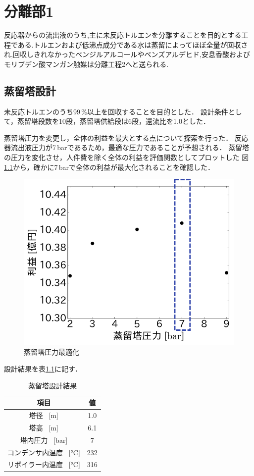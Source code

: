 \documentclass[a4j]{jsreport}
\begin{document}
\clearpage
\chapter{分離部1}
反応器からの流出液のうち,主に未反応トルエンを分離することを目的とする工程である.トルエンおよび低沸点成分である水は蒸留によってほぼ全量が回収され,回収しきれなかったベンジルアルコールやベンズアルデヒド,安息香酸およびモリブデン酸マンガン触媒は分離工程2へと送られる.
\section{蒸留塔設計}
未反応トルエンのうち99\,\%以上を回収することを目的とした．
設計条件として，蒸留塔段数を10段，蒸留塔供給段は6段，還流比を1.0とした．

蒸留塔圧力を変更し，全体の利益を最大とする点について探索を行った．
反応器流出液圧力が7\,\si{\bar}であるため，最適な圧力であることが予想される．
蒸留塔の圧力を変化させ，人件費を除く全体の利益を評価関数としてプロットした
図\ref{蒸留塔圧力最適化}から，確かに7\,\si{\bar}で全体の利益が最大化されることを確認した．
\begin{figure}[htbp]
  \centering
  \includegraphics[scale=0.7]{DistillationPressue.png}
  \caption{蒸留塔圧力最適化}
  \label{蒸留塔圧力最適化}
\end{figure}

設計結果を表\ref{蒸留塔設計結果}に記す．
\begin{table}[htbp]
  \label{蒸留塔設計結果}
  \caption{蒸留塔設計結果}
  \centering
  \begin{tabular}{cc}
      \hline
      項目 & 値 \\
      \hline
      塔径 \, [\si{\metre}] & 1.0 \\
      塔高 \, [\si{\metre}] & 6.1 \\
      塔内圧力 \, [\si{\bar}] &7 \\
      コンデンサ内温度 \, [\si{\degreeCelsius}] & 232 \\
      リボイラー内温度 \, [\si{\degreeCelsius}] & 316 \\
      \hline
  \end{tabular}
\end{table}
\end{document}
